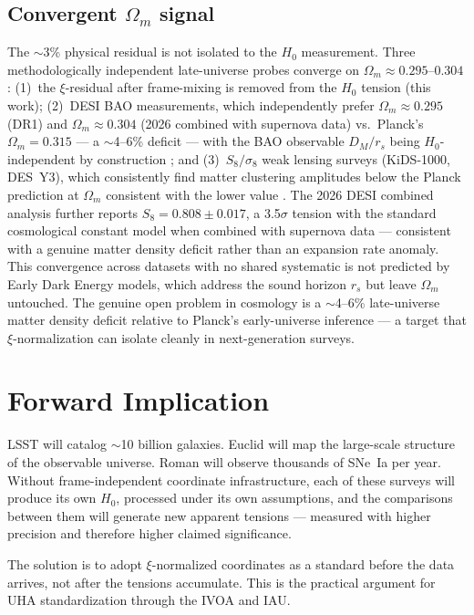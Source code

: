 \documentclass[12pt,a4paper]{article}
\begin{document}
\subsection*{Convergent $\Omega_m$ signal}

The $\sim$3\% physical residual is not isolated to the $H_0$ measurement.
Three methodologically independent late-universe probes converge on
$\Omega_m \approx 0.295$--$0.304$: (1)~the $\xi$-residual after frame-mixing
is removed from the $H_0$ tension (this work); (2)~DESI BAO measurements,
which independently prefer $\Omega_m \approx 0.295$ (DR1) and
$\Omega_m \approx 0.304$ (2026 combined with supernova data) vs.\ Planck's
$\Omega_m = 0.315$ --- a $\sim$4--6\% deficit --- with the BAO observable
$D_M/r_s$ being $H_0$-independent by construction \citep{desi2024}; and
(3)~$S_8/\sigma_8$ weak lensing surveys (KiDS-1000, DES~Y3), which
consistently find matter clustering amplitudes below the Planck prediction
at $\Omega_m$ consistent with the lower value \citep{heymans2021,amon2022}.
The 2026 DESI combined analysis further reports $S_8 = 0.808 \pm 0.017$,
a 3.5$\sigma$ tension with the standard cosmological constant model when
combined with supernova data --- consistent with a genuine matter density
deficit rather than an expansion rate anomaly. This convergence across
datasets with no shared systematic is not predicted by Early Dark Energy
models, which address the sound horizon $r_s$ but leave $\Omega_m$
untouched. The genuine open problem in cosmology is a $\sim$4--6\%
late-universe matter density deficit relative to Planck's early-universe
inference --- a target that $\xi$-normalization can isolate cleanly in
next-generation surveys.

\section{Forward Implication}

LSST will catalog $\sim$10 billion galaxies. Euclid will map the large-scale
structure of the observable universe. Roman will observe thousands of SNe~Ia
per year. Without frame-independent coordinate infrastructure, each of these
surveys will produce its own $H_0$, processed under its own assumptions, and
the comparisons between them will generate new apparent tensions --- measured
with higher precision and therefore higher claimed significance.

The solution is to adopt $\xi$-normalized coordinates as a standard before the
data arrives, not after the tensions accumulate. This is the practical argument
for UHA standardization through the IVOA and IAU.
\end{document}
